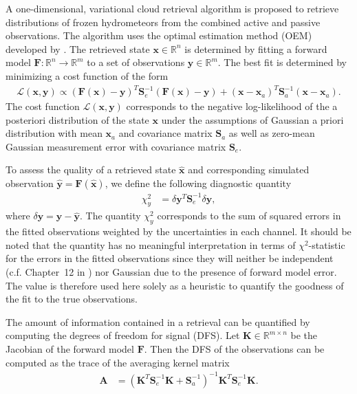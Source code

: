 \documentclass[journal abbreviation, manuscript]{copernicus}
\begin{document}
A one-dimensional, variational cloud retrieval algorithm is proposed to
retrieve distributions of frozen hydrometeors from the combined active and
passive observations. The algorithm uses the optimal estimation method (OEM)
developed by \cite{rodgers00}. The retrieved state $\mathbf{x} \in
   \mathbb{R}^n$ is determined by fitting a forward model $\mathbf{F} : \mathbb{R}^n
   \rightarrow \mathbb{R}^m$ to a set of observations $\mathbf{y} \in
   \mathbb{R}^m$. The best fit is determined by minimizing a cost function of
the form
\begin{align}
\mathcal{L}(\mathbf{x}, \mathbf{y}) \propto
 \left(\mathbf{F}(\mathbf{x}) - \mathbf{y} \right )^T
  \mathbf{S}_e^{-1} 
  \left ( \mathbf{F}(\mathbf{x}) - \mathbf{y} \right)
+ \left ( \mathbf{x} - \mathbf{x}_a \right )^T
 \mathbf{S}^{-1}_a 
 \left ( \mathbf{x} - \mathbf{x}_a \right ).
\end{align}
%
The cost function $\mathcal{L}(\mathbf{x}, \mathbf{y})$ corresponds to the negative
log-likelihood of the a posteriori distribution of the state $\mathbf{x}$ under
the assumptions of Gaussian a priori distribution with mean $\mathbf{x}_a$ and
covariance matrix $\mathbf{S}_a$ as well as zero-mean Gaussian measurement error
with covariance matrix $\mathbf{S}_e$.

To assess the quality of a retrieved state $\hat{\mathbf{x}}$ and corresponding simulated
observation $\hat{\mathbf{y}} = \mathbf{F}(\hat{\mathbf{x}})$, we define the following diagnostic
quantity
\begin{align}
\chi^2_y &= \delta \mathbf{y}^T
  \mathbf{S}_e^{-1} 
  \delta \mathbf{y},
\end{align}
where $\delta \mathbf{y} = \mathbf{y} - \hat{\mathbf{y}}$. The quantity
$\chi^2_y$ corresponds to the sum of squared errors in the fitted observations
weighted by the uncertainties in each channel. It should be noted that the
quantity has no meaningful interpretation in terms of $\chi^2$-statistic for the
errors in the fitted observations since they will neither be independent (c.f.
Chapter~12 in \cite{rodgers00}) nor Gaussian due to the presence of forward
model error. The value is therefore used here solely as a heuristic to quantify
the goodness of the fit to the true observations.

The amount of information contained in a retrieval can be quantified by
computing the degrees of freedom for signal (DFS). Let $\mathbf{K} \in
\mathbb{R}^{m \times n}$ be the Jacobian of the forward model $\mathbf{F}$. Then
the DFS of the observations can be computed as the trace of the averaging kernel
matrix
\begin{align}
  \mathbf{A} &=(\mathbf{K}^T\mathbf{S}_e^{-1}\mathbf{K} + \mathbf{S}_a^{-1})^{-1}
  \mathbf{K}^T\mathbf{S}_e^{-1}\mathbf{K}.
\end{align}
\end{document}
